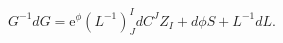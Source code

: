 \begin{equation}G^{-1}dG=\mathrm{e}^\phi (L^{-1})^I_JdC^JZ_I+ d\phi S
+L^{-1}dL.\label{vielbein}\end{equation} 
